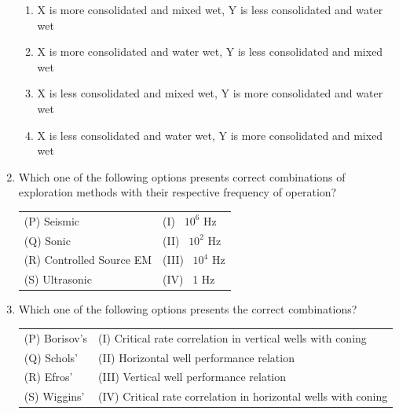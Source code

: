 \documentclass[12pt,a4paper]{article}
\begin{document}
\begin{enumerate}
\begin{enumerate} 

	\item X is more consolidated and mixed wet, Y is less consolidated and water wet
	\item X is more consolidated and water wet, Y is less consolidated and mixed wet
	\item X is less consolidated and mixed wet, Y is more consolidated and water wet
	\item X is less consolidated and water wet, Y is more consolidated and mixed wet\\
\end{enumerate}

\item Which one of the following options presents correct combinations of exploration methods with their respective frequency of operation? \hfill{}\vspace{0.3cm}
\begin{tabular}{ll}
(P) Seismic               & (I) ~$10^6$ Hz \\
(Q) Sonic                 & (II) ~$10^2$ Hz \\
(R) Controlled Source EM & (III) ~$10^4$ Hz \\
(S) Ultrasonic            & (IV) ~1 Hz \\
\end{tabular}


\begin{enumerate} 
\end{enumerate}

\pagebreak

\item Which one of the following options presents the correct combinations? \hfill{}\vspace{0.3cm}
\begin{tabular}{ll}
(P) Borisov's  & (I) Critical rate correlation in vertical wells with coning \\
(Q) Schols'    & (II) Horizontal well performance relation \\
(R) Efros'     & (III) Vertical well performance relation \\
(S) Wiggins'   & (IV) Critical rate correlation in horizontal wells with coning 
\end{tabular}



\end{enumerate}
\end{document}
